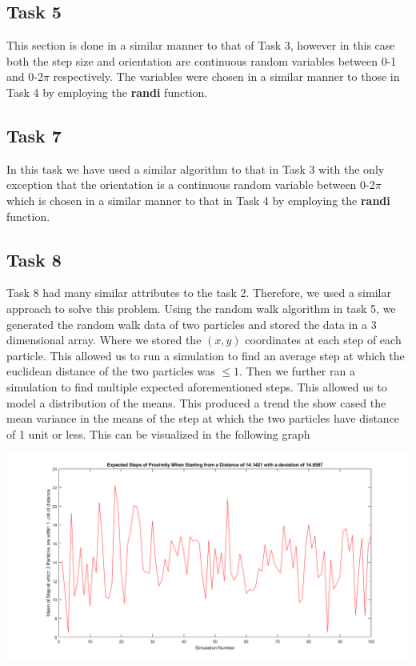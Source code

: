 \documentclass{article}
\begin{document}
\subsection{Task 5}
This section is done in a similar manner to that of Task 3, however in this case both the step size and orientation are continuous random variables between 0-1 and 0-2$\pi$ respectively. The variables were chosen in a similar manner to those in Task 4 by employing the \textbf{randi} function.
\subsection{Task 7}
In this task we have used a similar algorithm to that in Task 3 with the only exception that the orientation is a continuous random variable between 0-2$\pi$ which is chosen in a similar manner to that in Task 4 by employing the \textbf{randi} function. 
\subsection{Task 8}
Task 8 had many similar attributes to the task 2. Therefore, we used a similar approach to solve this problem. Using the random walk algorithm in task 5, we generated the random walk data
of two particles and stored the data in a 3 dimensional array. Where we stored the $(x,y)$ coordinates at each step of each particle. This allowed us to run a simulation to find an average 
step at which the euclidean distance of the two particles was $\leq 1$. Then we further ran a simulation to find multiple expected aforementioned steps. This allowed us to model a distribution 
of the means. This produced a trend the show cased the mean variance in the means of the step at which the two particles have distance of 1 unit or less. This can be visualized in the following 
graph
\begin{center}
    \includegraphics[scale = 0.4]{Meandist.png}
\end{center}
\newpage
\end{document}
